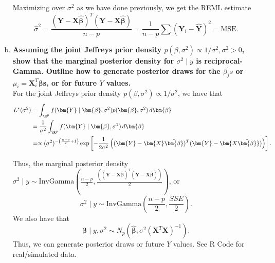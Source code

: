 \begin{enumerate}[a)]
Maximizing over $\sigma^2$ as we have done previously, we get the REML estimate
\[
    \hat{\sigma}^2 = \frac{(\bm{Y} - \bm{X\hat{\beta}})^T (\bm{Y} - \bm{X\hat{\beta}})}{n - p} = \frac{1}{n-p} \sum (\bm{Y}_i - \hat{\bm{Y}})^2 = \text{MSE}. 
\]

\item \textbf{Assuming the joint Jeffreys prior density $p(\beta, \sigma^2) \propto 1/\sigma^2, \sigma^2 > 0$, show that the marginal posterior density for $\sigma^2 \mid y$
is reciprocal-Gamma. Outline how to generate posterior draws for the $\beta_j^{\prime}s$ or $\mu_i = \bm{X}_i^T \bm{\beta}$s, or for future $Y$ values.} \\

For the joint Jeffreys prior density $p(\beta, \sigma^2) \propto 1/\sigma^2$, we have that
\begin{align*}
    L^*(\sigma^2) &= \int_{\R^p} f(\bm{Y} \mid \bm{\beta}, \sigma^2) p(\bm{\beta}, \sigma^2) \, d\bm{\beta} \\
    &= \frac{1}{\sigma^2} \int_{\R^p} f(\bm{Y} \mid \bm{\beta}, \sigma^2) \, d\bm{\beta} \\
    &=  \propto (\sigma^2)^{-\left(\frac{n - p}{2} + 1\right)}  \exp \left[ -\frac{1}{2\sigma^2} \left( (\bm{Y} - \bm{X}\hat{\bm{\beta}})^T(\bm{Y} - \bm{X\hat{\bm{\beta}}}) \right) \right].
\end{align*}

Thus, the marginal posterior density $\sigma^2 \mid y \sim \mathrm{InvGamma}\left( \frac{n-p}{2}, \frac{\left( (\bm{Y} - \bm{X}\hat{\bm{\beta}})^T(\bm{Y} - \bm{X\hat{\bm{\beta}}}) \right)}{2}\right)$, or
\[
    \boxed{\sigma^2 \mid y \sim \mathrm{InvGamma}\left( \frac{n-p}{2}, \frac{SSE}{2}\right)}. 
\]
We also have that 
\[
    \bm{\beta} \mid y, \sigma^2 \sim N_p(\hat{\bm{\beta}}, \sigma^2(\bm{X}^T\bm{X})^{-1}). 
\]
Thus, we can generate posterior draws or future $Y$ values. See R Code for real/simulated data.

\end{enumerate}
